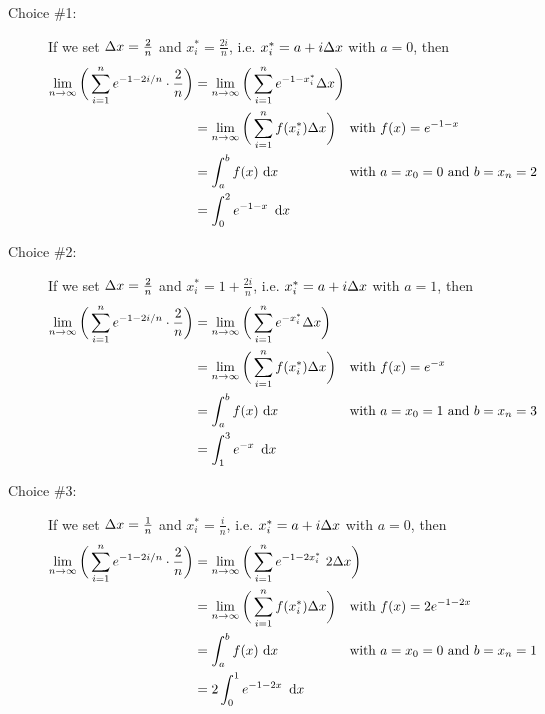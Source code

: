\begin{solution}
\begin{description}
\item[Choice \#1:]
If we set $\Delta x = \frac{2}{n}$ and $x_i^*= \frac{2i}{n}$, i.e. $x_i^* = a + i\Delta x$ with $a=0$,
then
\begin{align*}
\lim_{n\rightarrow\infty} \bigg( \sum_{i=1}^n e^{-1-2i/n}\cdot \frac{2}{n} \bigg)
&=\lim_{n\rightarrow\infty} \bigg( \sum_{i=1}^n e^{-1-x_i^*}\De x \bigg) \hidewidth \\
&=\lim_{n\rightarrow\infty} \bigg( \sum_{i=1}^n f(x_i^*)\De x \bigg) &&\text{with $f(x) = e^{-1-x}$} \\
&=\int_a^b f(x)\,\,\dee{x}&&\text{with $a=x_0=0$ and $b=x_n=2$} \\
&=\int_0^2 e^{-1-x}\ \,\dee{x}
\end{align*}


\item[Choice \#2:]
If we set $\Delta x = \frac{2}{n}$ and $x_i^*= 1+\frac{2i}{n}$, i.e. $x_i^* = a + i\Delta x$
with $a=1$,
then
\begin{align*}
\lim_{n\rightarrow\infty} \bigg( \sum_{i=1}^n e^{-1-2i/n}\cdot \frac{2}{n} \bigg)
&=\lim_{n\rightarrow\infty} \bigg( \sum_{i=1}^n e^{-x_i^*}\De x \bigg) \hidewidth \\
&=\lim_{n\rightarrow\infty} \bigg( \sum_{i=1}^n f(x_i^*)\De x \bigg) &&\text{with $f(x) = e^{-x}$} \\
&=\int_a^b f(x)\,\,\dee{x}&&\text{with $a=x_0=1$ and $b=x_n=3$} \\
&=\int_1^3 e^{-x}\ \,\dee{x}
\end{align*}

\item[Choice \#3:]
If we set $\Delta x = \frac{1}{n}$ and $x_i^*= \frac{i}{n}$, i.e. $x_i^* = a + i\Delta x$ with $a=0$,
then
\begin{align*}
\lim_{n\rightarrow\infty} \bigg( \sum_{i=1}^n e^{-1-2i/n}\cdot \frac{2}{n} \bigg)
&=\lim_{n\rightarrow\infty} \bigg( \sum_{i=1}^n e^{-1-2x_i^*}\ 2\De x \bigg) \hidewidth \\
&=\lim_{n\rightarrow\infty} \bigg( \sum_{i=1}^n f(x_i^*)\De x \bigg)
                       &&\text{with $f(x) = 2e^{-1-2x}$} \\
&=\int_a^b f(x)\,\,\dee{x}&&\text{with $a=x_0=0$ and $b=x_n=1$} \\
&=2\int_0^1 e^{-1-2x}\ \,\dee{x}
\end{align*}


\end{description}
\end{solution}

